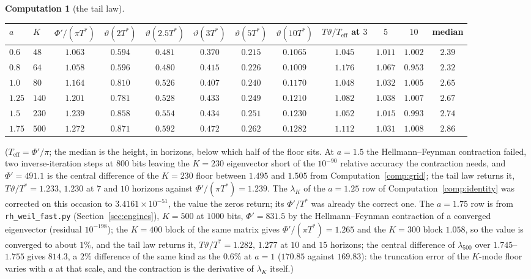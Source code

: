 \documentclass[11pt]{article}
\theoremstyle{definition}
\newtheorem{computation}[theorem]{Computation}
\theoremstyle{remark}
\newcommand{\Tst}{T^{*}}
\begin{document}
\begin{computation}[the tail law]
\begin{center}\footnotesize
\begin{tabular}{@{}llc|ccccc|ccc|c@{}}
\toprule
$a$ & $K$ & $\Phi'/(\pi\Tst)$ & $\vartheta(2\Tst)$ & $\vartheta(2.5\Tst)$ & $\vartheta(3\Tst)$ & $\vartheta(5\Tst)$ & $\vartheta(10\Tst)$ & $T\vartheta/T_{\mathrm{eff}}$ at $3$ & $5$ & $10$ & median\\
\midrule
$0.6$ & $48$ & $1.063$ & $0.594$ & $0.481$ & $0.370$ & $0.215$ & $0.1065$ & $1.045$ & $1.011$ & $1.002$ & $2.39$\\
$0.8$ & $64$ & $1.058$ & $0.596$ & $0.480$ & $0.415$ & $0.226$ & $0.1009$ & $1.176$ & $1.067$ & $0.953$ & $2.32$\\
$1.0$ & $80$ & $1.164$ & $0.810$ & $0.526$ & $0.407$ & $0.240$ & $0.1170$ & $1.048$ & $1.032$ & $1.005$ & $2.65$\\
$1.25$ & $140$ & $1.201$ & $0.781$ & $0.528$ & $0.433$ & $0.249$ & $0.1210$ & $1.082$ & $1.038$ & $1.007$ & $2.67$\\
$1.5$ & $230$ & $1.239$ & $0.858$ & $0.554$ & $0.434$ & $0.251$ & $0.1230$ & $1.052$ & $1.015$ & $0.993$ & $2.74$\\
$1.75$ & $500$ & $1.272$ & $0.871$ & $0.592$ & $0.472$ & $0.262$ & $0.1282$ & $1.112$ & $1.031$ & $1.008$ & $2.86$\\
\bottomrule
\end{tabular}
\end{center}
($T_{\mathrm{eff}}=\Phi'/\pi$; the median is the height, in horizons, below which half of the floor sits. At $a=1.5$ the Hellmann--Feynman contraction failed, two inverse-iteration steps at $800$ bits leaving the $K=230$ eigenvector short of the $10^{-90}$ relative accuracy the contraction needs, and $\Phi'=491.1$ is the central difference of the $K=230$ floor between $1.495$ and $1.505$ from Computation~\ref{comp:grid}; the tail law returns it, $T\vartheta/\Tst=1.233,\,1.230$ at $7$ and $10$ horizons against $\Phi'/(\pi\Tst)=1.239$. The $\lambda_K$ of the $a=1.25$ row of Computation~\ref{comp:identity} was corrected on this occasion to $3.4161\times10^{-51}$, the value the zeros return; its $\Phi'/\Tst$ was already the correct one. The $a=1.75$ row is from \texttt{rh\_weil\_fast.py} (Section~\ref{sec:engines}), $K=500$ at $1000$ bits, $\Phi'=831.5$ by the Hellmann--Feynman contraction of a converged eigenvector (residual $10^{-198}$); the $K=400$ block of the same matrix gives $\Phi'/(\pi\Tst)=1.265$ and the $K=300$ block $1.058$, so the value is converged to about $1\%$, and the tail law returns it, $T\vartheta/\Tst=1.282,\,1.277$ at $10$ and $15$ horizons; the central difference of $\lambda_{500}$ over $1.745$--$1.755$ gives $814.3$, a $2\%$ difference of the same kind as the $0.6\%$ at $a=1$ ($170.85$ against $169.83$): the truncation error of the $K$-mode floor varies with $a$ at that scale, and the contraction is the derivative of $\lambda_K$ itself.)

\end{computation}
\end{document}
